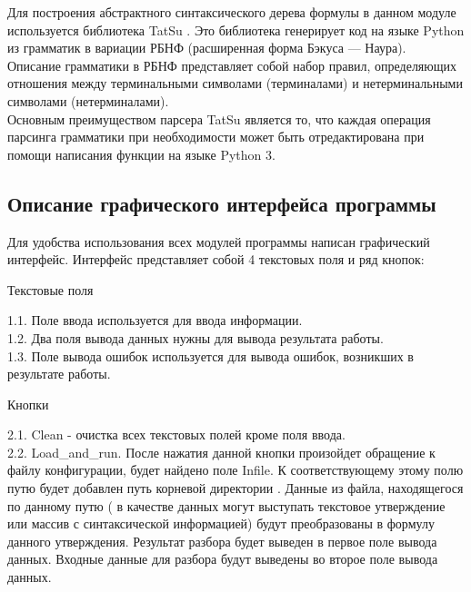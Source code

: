 \documentclass[12pt]{article}
\begin{document}
Для построения абстрактного синтаксического дерева формулы в данном модуле используется библиотека TatSu . Это библиотека генерирует код на языке Python из грамматик в вариации РБНФ (расширенная форма Бэкуса — Наура).\\

Описание грамматики в РБНФ представляет собой набор правил, определяющих отношения между терминальными символами (терминалами) и нетерминальными символами (нетерминалами). \\

Основным преимуществом парсера TatSu является то, что каждая операция парсинга грамматики при необходимости может быть отредактирована при помощи написания функции на языке Python 3.

\newpage
\subsection{Описание графического интерфейса программы}
Для удобства использования всех модулей программы написан графический интерфейс. Интерфейс представляет собой 4 текстовых поля и ряд кнопок:

\begin{center} Текстовые поля \end{center}

1.1. Поле ввода используется для ввода информации. \\

1.2. Два поля вывода данных нужны для вывода результата работы.\\

1.3. Поле вывода ошибок  используется для вывода ошибок, возникших в результате работы.

\begin{center} Кнопки \end{center}

2.1. Clean - очистка всех текстовых полей кроме поля ввода.\\

2.2. Load\_and\_run. После нажатия данной кнопки произойдет обращение к файлу конфигурации, будет найдено поле Infile. К соответствующему этому полю путю будет добавлен путь корневой директории .
Данные из  файла, находящегося по данному путю ( в качестве данных могут выступать текстовое утверждение или массив с синтаксической информацией) будут преобразованы в формулу данного утверждения.
 Результат разбора будет выведен в первое поле вывода данных. Входные данные для разбора будут выведены во второе поле вывода данных. \\
\end{document}
